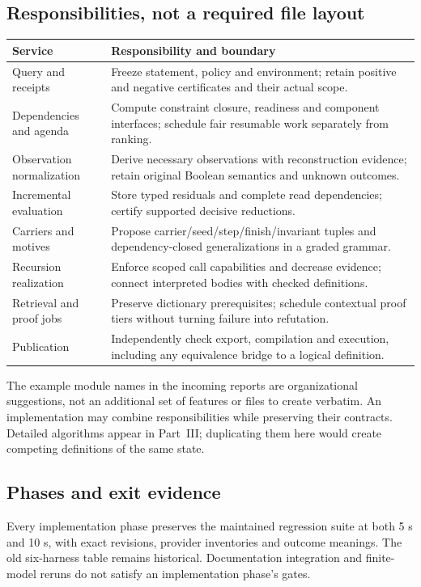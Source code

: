 \subsection{Responsibilities, not a required file layout}

\begin{longtable}{@{}L{36mm}L{115mm}@{}}
\toprule Service & Responsibility and boundary\\\midrule\endhead
Query and receipts & Freeze statement, policy and environment; retain positive and negative certificates and their actual scope.\\
Dependencies and agenda & Compute constraint closure, readiness and component interfaces; schedule fair resumable work separately from ranking.\\
Observation normalization & Derive necessary observations with reconstruction evidence; retain original Boolean semantics and unknown outcomes.\\
Incremental evaluation & Store typed residuals and complete read dependencies; certify supported decisive reductions.\\
Carriers and motives & Propose carrier/seed/step/finish/invariant tuples and dependency-closed generalizations in a graded grammar.\\
Recursion realization & Enforce scoped call capabilities and decrease evidence; connect interpreted bodies with checked definitions.\\
Retrieval and proof jobs & Preserve dictionary prerequisites; schedule contextual proof tiers without turning failure into refutation.\\
Publication & Independently check export, compilation and execution, including any equivalence bridge to a logical definition.\\
\bottomrule
\end{longtable}

The example module names in the incoming reports are organizational suggestions,
not an additional set of features or files to create verbatim. An implementation
may combine responsibilities while preserving their contracts. Detailed
algorithms appear in Part~III; duplicating them here would create competing
definitions of the same state.

\subsection{Phases and exit evidence}

Every implementation phase preserves the maintained regression suite at both
5 s and 10 s, with exact revisions, provider inventories and outcome meanings.
The old six-harness table remains historical. Documentation integration and
finite-model reruns do not satisfy an implementation phase's gates.

